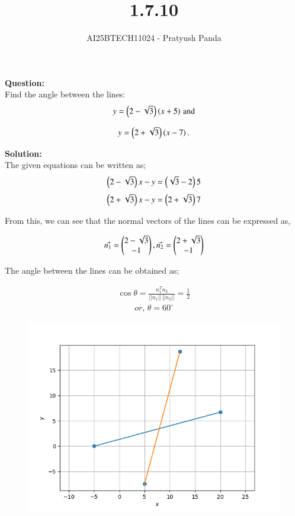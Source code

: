 \documentclass[journal]{IEEEtran}
\begin{document}

\vspace{3cm}

\title{1.7.10}
\author{AI25BTECH11024 - Pratyush Panda
}
\maketitle
{\let\newpage\relax\maketitle}

\renewcommand{\thefigure}{\theenumi}
\renewcommand{\thetable}{\theenumi}
\setlength{\intextsep}{10pt} %


\renewcommand{\thetable}{\theenumi}

\textbf{Question: } \\
Find the angle between the lines: \\
\begin{align}
y=\left(2-\sqrt{3}\right)\left(x+5\right) \, \text{and}
\end{align}

\begin{align}
y=\left(2+\sqrt{3}\right)\left(x-7\right).
\end{align}

\textbf{Solution: } \\
The given equations can be written as;
\begin{align}
\left(2-\sqrt{3}\right)x - y = \left(\sqrt{3}-2\right)5
\end{align}
\begin{align}
\left(2+\sqrt{3}\right)x - y = \left(2+\sqrt{3}\right)7
\end{align}

From this, we can see that the normal vectors of the lines can  be expressed as,

\begin{align}
\Vec{n_1}=\begin{pmatrix}2-\sqrt{3} \\ -1\end{pmatrix}, \Vec{n_2}=\begin{pmatrix}2+\sqrt{3} \\ -1\end{pmatrix}
\end{align}


The angle between the lines can be obtained as;

\begin{align}
\cos{\theta}=\frac{n_1^Tn_2}{||n_1||\,||n_2||}=\frac{1}{2}
\end{align}
\begin{align}
or, \, \theta=60^\circ
\end{align}

\begin{figure}[H]
\centering
\includegraphics[width=0.6\columnwidth]{figs/img.png}
\caption*{}
\end{figure}
\end{document}
